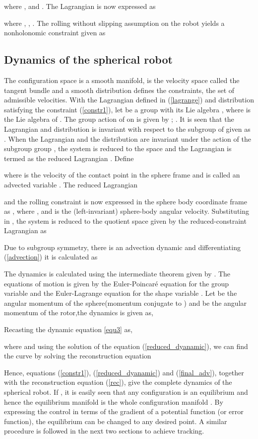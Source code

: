 \documentclass{ifacconf}
\begin{document}
where ,  and . The Lagrangian is now expressed as 

where , ,  . The rolling without slipping assumption on the robot yields a nonholonomic constraint given as

\subsection{Dynamics of the spherical robot} 
The configuration space  is a smooth manifold,  is the velocity space called the tangent bundle and a smooth distribution  defines the constraints, the set of admissible velocities. 
With the Lagrangian  defined in (\ref{lagrange}) and distribution  satisfying the constraint (\ref{constr1}), let  be a group with its Lie algebra , where  is the Lie algebra of . The group action of  on  is given by ; . It is seen that the Lagrangian  and distribution  is invariant with respect to the subgroup  of  given as
. When the Lagrangian  and the distribution  are invariant under the action of the subgroup group , the system is reduced to the space  and the Lagrangian is termed as the reduced Lagrangian . Define 

where  is the velocity of the contact point in the sphere frame and  is called an advected variable \citep{lhmnlc2012}. The reduced Lagrangian  

and the rolling constraint is now expressed in the sphere body coordinate frame as , 
where ,   and  is the (left-invariant) sphere-body angular velocity. Substituting  in , the system is reduced to the quotient space  given by the reduced-constraint Lagrangian  as

Due to subgroup symmetry, there is an advection dynamic and differentiating (\ref{advection}) it is calculated as

The dynamics is calculated using the intermediate theorem given by \citep{schneider}. The equations of motion is given by the Euler-Poincar\'{e} equation for the group variable  and the Euler-Lagrange equation for the shape variable .
Let  be the angular momentum of the sphere(momentum conjugate to ) and  be the angular momentum of the  rotor,the dynamics is given as, 

Recasting the dynamic equation \eqref{equ3} as,

where  and using the solution  of the equation (\ref{reduced_dyanamic}), we can find the curve  by solving the reconstruction equation 

Hence, equations (\ref{constr1}), (\ref{reduced_dyanamic}) and (\ref{final_adv}), together with the reconstruction equation (\ref{rec}), give the complete dynamics of the spherical robot. If , it is easily seen that any configuration is an equilibrium and hence the equilibrium manifold is the whole configuration manifold . By expressing the control in terms of the gradient of a potential function (or error function), the equilibrium can be changed to any desired point. A similar procedure is followed in the next two sections to achieve tracking. 
\end{document}

